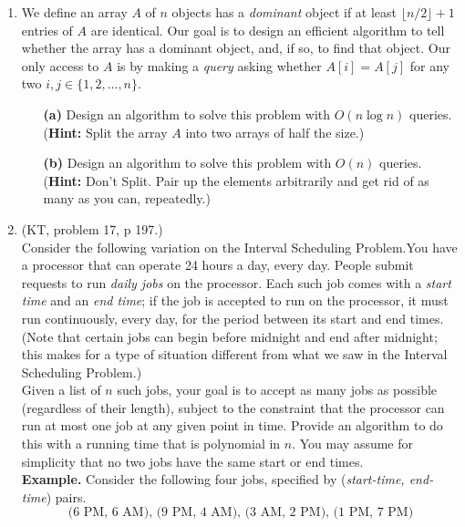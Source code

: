 \documentclass[11pt]{article}
\begin{document}
\begin{enumerate}
\vspace*{.2cm}
\item We define an array $A$ of $n$ objects has a \emph{dominant} object if at least $\lfloor n/2 \rfloor+1$ entries of $A$ are identical. Our goal is to design an efficient algorithm to tell whether the array has a dominant object, and, if so, to find that object. Our only access to $A$ is by making a \textit{query} asking whether $A[i] = A[j]$ for any two $i,j \in \{ 1, 2, \ldots, n \}$. 
\begin{enumerate}
\item[\textbf{(a)}] Design an algorithm to solve this problem with $O(n \log n)$ queries. (\textbf{Hint:} Split the array $A$ into two arrays of half the size.)
\item[\textbf{(b)}] Design an algorithm to solve this problem with $O(n)$ queries. (\textbf{Hint:} Don't Split. Pair up the elements arbitrarily and get rid of as many as you can, repeatedly.)
\end{enumerate}

\vspace*{.2cm}
\item (KT, problem 17, p 197.)\\
Consider the following variation on the Interval Scheduling Problem.You have a processor that can operate 24 hours a day, every day. People submit requests to run \textit{daily jobs} on the processor. Each such job comes with a \textit{start time} and an \textit{end time}; if the job is accepted to run on the processor, it must run continuously, every day, for the period between its start and end times. (Note that certain jobs can begin before midnight and end after midnight; this makes for a type of situation different from what we saw in the Interval Scheduling Problem.)\\

Given a list of $n$ such jobs, your goal is to accept as many jobs as possible (regardless of their length), subject to the constraint that the processor can run at most one job at any given point in time. Provide an algorithm to do this with a running time that is polynomial in $n$. You may assume for simplicity that no two jobs have the same start or end times.\\

\textbf{Example.} Consider the following four jobs, specified by (\textit{start-time, end- time}) pairs.\\
\begin{displaymath}
\text{(6 PM, 6 AM), (9 PM, 4 AM), (3 AM, 2 PM), (1 PM, 7 PM)}
\end{displaymath}


\end{enumerate}
\end{document}

